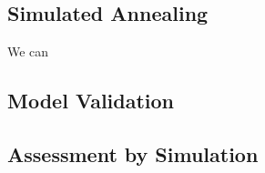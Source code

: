 		
	
	

	\subsection{Simulated Annealing}
	\label{ssec:model-selec}
	
		We can 

		
	\subsection{Model Validation}
	\label{ssec:model-validation}
	
	
	
	\subsection{Assessment by Simulation}
	\label{ssec:simulation}
	
		
		

